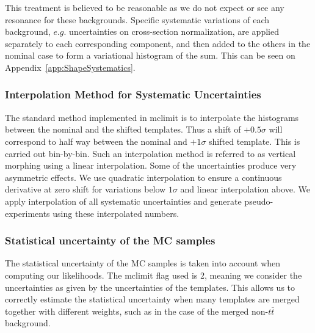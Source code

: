 This treatment is believed to be reasonable as we do not expect or see any resonance for these backgrounds. Specific systematic variations of each background, $e.g.$ uncertainties on cross-section normalization, are applied separately to each corresponding component, and then added to the others in the nominal case to form a variational histogram of the sum. This can be seen on Appendix~\ref{app:ShapeSystematics}.


\subsubsection{Interpolation Method for Systematic Uncertainties}
The standard method implemented in {\sc mclimit} is to interpolate the histograms between the nominal and the shifted templates. 
Thus a shift of $+0.5\sigma$ will correspond to half way between the nominal and $+1\sigma$ shifted template. This is carried out bin-by-bin.
Such an interpolation method is referred to as vertical morphing using a linear interpolation. Some of the uncertainties produce very 
asymmetric effects. We use quadratic interpolation to ensure a continuous derivative at zero shift for variations below $1\sigma$ and 
linear interpolation above. We apply interpolation of all systematic uncertainties and generate pseudo-experiments using these 
interpolated numbers.

\subsubsection{Statistical uncertainty of the MC samples}
The statistical uncertainty of the MC samples is taken into account when computing our likelihoods.
The {\sc mclimit} flag used is 2, meaning we consider the uncertainties as given by the uncertainties of the templates. 
This allows us to correctly estimate the statistical uncertainty when many templates are merged together with different weights, such as in
the case of the merged non-$t\bar{t}$ background.

